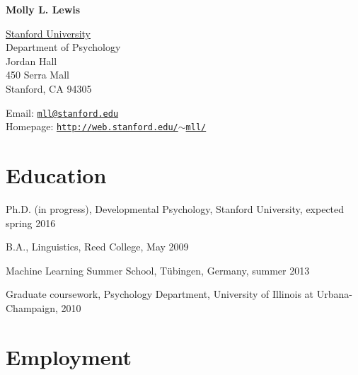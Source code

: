 \documentclass[letterpaper]{article}
\def\name{Molly L.  Lewis}
\renewenvironment{itemize}{
  \begin{list}{}{
    \setlength{\leftmargin}{1.5em}
  }
}{
  \end{list}
}
\begin{document}
\centerline{\huge \bf \name}
\vspace{0.25in}


 \normalsize
  \href{http://www.stanford.edu/}{Stanford University} \\
  Department of Psychology \\
  Jordan Hall\\
  450 Serra Mall \\
  Stanford, CA 94305\\
  
  \begin{minipage}{0.45\linewidth}
Email: \href{mailto:mll@stanford.edu}{\tt mll@stanford.edu}\\
Homepage: \href{http://web.stanford.edu/~mll/}{\tt http://web.stanford.edu/$\sim$mll/}\\
 
\end{minipage}


\section*{Education}

\begin{itemize}
  \item Ph.D. (in progress), Developmental Psychology, Stanford University, expected spring 2016

  \item B.A., Linguistics, Reed College, May 2009
    \item Machine Learning Summer School, T\"{u}bingen, Germany, summer 2013 

    \item Graduate coursework, Psychology Department, University of Illinois at Urbana-Champaign, 2010

  

\end{itemize}

\section*{Employment}
\end{document}
